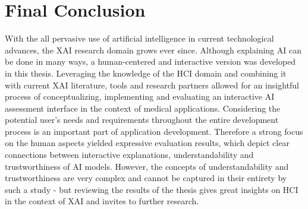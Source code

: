 \documentclass[11pt,a4paper,english]{scrreprt}
\begin{document}
\section{Final Conclusion}
With the all pervasive use of artificial intelligence in current technological advances, the XAI research domain grows ever since. Although explaining AI can be done in many ways, a human-centered and interactive version was developed in this thesis. Leveraging the knowledge of the HCI domain and combining it with current XAI literature, tools and research partners allowed for an insightful process of conceptualizing, implementing and evaluating an interactive AI assessment interface in the context of medical applications. Considering the potential user's needs and requirements throughout the entire development process is an important part of application development. Therefore a strong focus on the human aspects yielded expressive evaluation results, which depict clear connections between interactive explanations, understandability and trustworthiness of AI models. However, the concepts of understandability and trustworthiness are very complex and cannot be captured in their entirety by such a study - but reviewing the results of the thesis gives great insights on HCI in the context of XAI and invites to further research.

\clearpage

\end{document}
